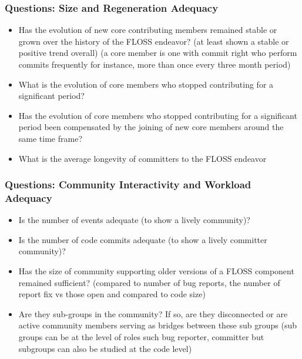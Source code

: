 \documentclass{beamer}
\begin{document}
\begin{frame}
\frametitle{Questions: Size and Regeneration Adequacy}
\begin{center}
\begin{itemize}
\item  Has the evolution of new core contributing members remained stable
or grown over the history of the FLOSS endeavor? (at least shown a
stable or positive trend overall) (a core member is one with commit
right who perform commits frequently for instance, more than once
every three month period)
\item  What is the evolution of core members who stopped contributing for
a significant period?
\item  Has the evolution of core members who stopped contributing for a
significant period been compensated by the joining of new core members around the same time frame?
\item What is the average longevity of committers to the FLOSS endeavor

\end{itemize}
\end{center}
\end{frame}


\begin{frame}
\frametitle{Questions: Community Interactivity and Workload Adequacy}
\begin{center}
\begin{itemize}
\item  Is the number of events adequate (to show a lively community)?
\item Is the number of code commits adequate (to show a lively committer
community)?
\item Has the size of community supporting older versions of a FLOSS
component remained sufficient? (compared to number of bug reports,
the number of report fix vs those open and compared to code size)
\item Are they sub-groups in the community? If so, are they disconnected
or are active community members serving as bridges between these
sub groups (sub groups can be at the level of roles such bug reporter,
committer but subgroups can also be studied at the code level)

\end{itemize}
\end{center}
\end{frame}
\end{document}
